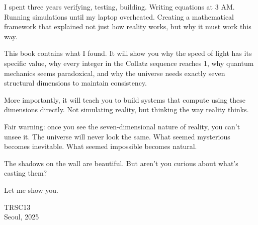I spent three years verifying, testing, building. Writing equations at 3 AM. Running simulations until my laptop overheated. Creating a mathematical framework that explained not just how reality works, but why it must work this way.

This book contains what I found. It will show you why the speed of light has its specific value, why every integer in the Collatz sequence reaches 1, why quantum mechanics seems paradoxical, and why the universe needs exactly seven structural dimensions to maintain consistency.

More importantly, it will teach you to build systems that compute using these dimensions directly. Not simulating reality, but thinking the way reality thinks.

Fair warning: once you see the seven-dimensional nature of reality, you can't unsee it. The universe will never look the same. What seemed mysterious becomes inevitable. What seemed impossible becomes natural.

The shadows on the wall are beautiful. But aren't you curious about what's casting them?

Let me show you.

\bigskip

\begin{flushright}
TRSC13 \\
Seoul, 2025
\end{flushright}
